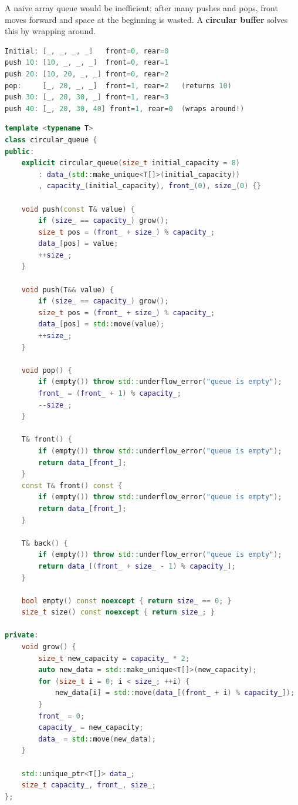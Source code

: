 A naive array queue would be inefficient: after many pushes and pops, front moves forward and space at the beginning is wasted. A \textbf{circular buffer} solves this by wrapping around.

\begin{lstlisting}[language=Java]
Initial: [_, _, _, _]   front=0, rear=0
push 10: [10, _, _, _]  front=0, rear=1
push 20: [10, 20, _, _] front=0, rear=2
pop:     [_, 20, _, _]  front=1, rear=2   (returns 10)
push 30: [_, 20, 30, _] front=1, rear=3
push 40: [_, 20, 30, 40] front=1, rear=0  (wraps around!)
\end{lstlisting}

\begin{lstlisting}[language=C++]
template <typename T>
class circular_queue {
public:
    explicit circular_queue(size_t initial_capacity = 8)
        : data_(std::make_unique<T[]>(initial_capacity))
        , capacity_(initial_capacity), front_(0), size_(0) {}

    void push(const T& value) {
        if (size_ == capacity_) grow();
        size_t pos = (front_ + size_) % capacity_;
        data_[pos] = value;
        ++size_;
    }

    void push(T&& value) {
        if (size_ == capacity_) grow();
        size_t pos = (front_ + size_) % capacity_;
        data_[pos] = std::move(value);
        ++size_;
    }

    void pop() {
        if (empty()) throw std::underflow_error("queue is empty");
        front_ = (front_ + 1) % capacity_;
        --size_;
    }

    T& front() {
        if (empty()) throw std::underflow_error("queue is empty");
        return data_[front_];
    }
    const T& front() const {
        if (empty()) throw std::underflow_error("queue is empty");
        return data_[front_];
    }

    T& back() {
        if (empty()) throw std::underflow_error("queue is empty");
        return data_[(front_ + size_ - 1) % capacity_];
    }

    bool empty() const noexcept { return size_ == 0; }
    size_t size() const noexcept { return size_; }

private:
    void grow() {
        size_t new_capacity = capacity_ * 2;
        auto new_data = std::make_unique<T[]>(new_capacity);
        for (size_t i = 0; i < size_; ++i) {
            new_data[i] = std::move(data_[(front_ + i) % capacity_]);
        }
        front_ = 0;
        capacity_ = new_capacity;
        data_ = std::move(new_data);
    }

    std::unique_ptr<T[]> data_;
    size_t capacity_, front_, size_;
};
\end{lstlisting}

